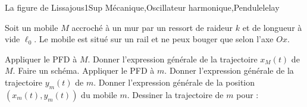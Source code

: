 
\begin{exercise}{La figure de Lissajous}{1}{Sup}
{Mécanique,Oscillateur harmonique,Pendule}{lelay}

Soit un mobile $M$ accroché à un mur par un ressort de raideur $k$ et de longueur à vide $\ell_0$. Le mobile est situé sur un rail et ne peux bouger que selon l'axe $Ox$.
\begin{questions}
    \question Appliquer le PFD à $M$. Donner l'expression générale de la trajectoire $x_M(t)$ de $M$.
    \question Faire un schéma. Appliquer le PFD à $m$. Donner l'expression générale de la trajectoire $y_m(t)$ de $m$.
    \question Donner l'expression générale de la position $(x_m(t), y_m(t))$ du mobile $m$. Dessiner la trajectoire de $m$ pour :
\end{questions}
\end{exercise}